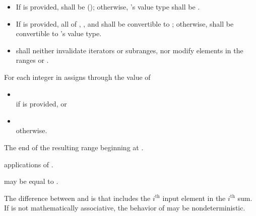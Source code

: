 \begin{itemdescr}
\pnum
\requires
\begin{itemize}
\item If  is provided,  shall be 
(); otherwise, 's value
type shall be .

\item If  is provided, all of ,
, and  shall be
convertible to ; otherwise,  shall be
convertible to 's value type.

\item {} shall neither invalidate iterators or subranges, nor
modify elements in the ranges  or
.
\end{itemize}

\pnum
\effects
For each integer  in 
assigns through  the value of
\begin{itemize}
\item
  \\if {} is provided, or
\item
  \\otherwise.
\end{itemize}

\pnum
\returns
The end of the resulting range beginning at .

\pnum
\complexity
{} applications of .

\pnum
\remarks
{} may be equal to .

\pnum
\begin{note}
The difference between  and  is
that  includes the $i^\text{th}$ input element in the
$i^\text{th}$ sum.  If  is not mathematically associative, the
behavior of  may be nondeterministic.
\end{note}
\end{itemdescr}

